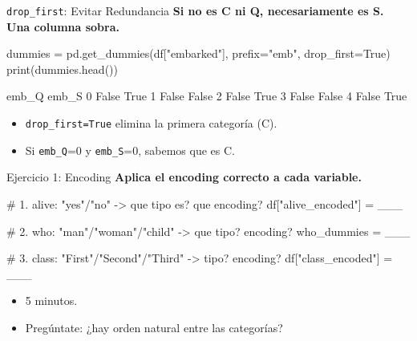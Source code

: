 \documentclass[aspectratio=169, 11pt]{beamer}
\begin{document}
\begin{frame}[fragile,shrink=28]{\texttt{drop\_first}: Evitar Redundancia}
  \vspace{-6pt}
  {\footnotesize\color{arcaDark}\bfseries
    Si no es C ni Q, necesariamente es S. Una columna sobra.}

  \vspace{4pt}
  \begin{pyblock}
dummies = pd.get_dummies(df["embarked"],
                         prefix="emb",
                         drop_first=True)
print(dummies.head())
  \end{pyblock}

  \vspace{4pt}
  \begin{outputblock}
   emb_Q  emb_S
0  False   True
1  False  False
2  False   True
3  False  False
4  False   True
  \end{outputblock}

  \vspace{4pt}
  {\scriptsize\color{textMuted}
  \begin{itemize}\setlength{\itemsep}{3pt}
    \item[{\color{arcaRed}\scriptsize\faArrowRight}]
      \texttt{drop\_first=True} elimina la primera categoría (C).
    \item[{\color{arcaRed}\scriptsize\faArrowRight}]
      Si \texttt{emb\_Q}=0 y \texttt{emb\_S}=0, sabemos que es C.
  \end{itemize}
  }
\end{frame}

\begin{frame}[fragile,shrink=28]{Ejercicio 1: Encoding \hfill {\normalsize\faLaptopCode}}
  \vspace{-6pt}
  {\footnotesize\color{arcaDark}\bfseries
    Aplica el encoding correcto a cada variable.}

  \vspace{4pt}
  \begin{pyblock}
# 1. alive: "yes"/"no" -> que tipo es? que encoding?
df["alive_encoded"] = ___

# 2. who: "man"/"woman"/"child" -> que tipo? encoding?
who_dummies = ___

# 3. class: "First"/"Second"/"Third" -> tipo? encoding?
df["class_encoded"] = ___
  \end{pyblock}

  \vspace{4pt}
  {\scriptsize\color{textMuted}
  \begin{itemize}\setlength{\itemsep}{3pt}
    \item[{\color{arcaRed}\scriptsize\faClock}] 5 minutos.
    \item[{\color{codeOrange}\scriptsize\faLightbulb}]
      Pregúntate: ¿hay orden natural entre las categorías?
  \end{itemize}
  }
\end{frame}
\end{document}
